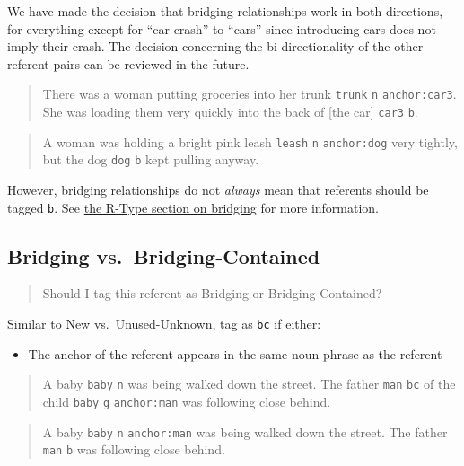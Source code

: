 \documentclass[
]{book}
\providecommand{\tightlist}{%
  \setlength{\itemsep}{0pt}\setlength{\parskip}{0pt}}
\begin{document}
We have made the decision that bridging relationships work in both directions,
for everything except for ``car crash'' to ``cars'' since introducing cars does not imply their crash.
The decision concerning the bi-directionality of the other referent pairs can be reviewed in the future.

\begin{quote}
There was a woman putting groceries into her trunk \texttt{trunk} \texttt{n} \texttt{anchor:car3}.
She was loading them very quickly into the back of {[}the car{]} \texttt{car3} \texttt{b}.
\end{quote}

\begin{quote}
A woman was holding a bright pink leash \texttt{leash} \texttt{n} \texttt{anchor:dog} very tightly,
but the dog \texttt{dog} \texttt{b} kept pulling anyway.
\end{quote}

However, bridging relationships do not \emph{always} mean that
referents should be tagged \texttt{b}.
See \protect\hyperlink{bridging}{the R-Type section on bridging} for more information.

\hypertarget{bridging-vs.-bridging-contained}{%
\subsection{Bridging vs.~Bridging-Contained}\label{bridging-vs.-bridging-contained}}

\begin{quote}
Should I tag this referent as Bridging or Bridging-Contained?
\end{quote}

Similar to \protect\hyperlink{new-vs.-unused-unknown}{New vs.~Unused-Unknown},
tag as \texttt{bc} if either:

\begin{itemize}
\tightlist
\item
  The anchor of the referent appears in the same noun phrase as the referent
\end{itemize}

\begin{quote}
A baby \texttt{baby} \texttt{n} was being walked down the street.
The father \texttt{man} \texttt{bc} of the child \texttt{baby} \texttt{g} \texttt{anchor:man} was following close behind.
\end{quote}

\begin{quote}
A baby \texttt{baby} \texttt{n} \texttt{anchor:man} was being walked down the street.
The father \texttt{man} \texttt{b} was following close behind.
\end{quote}
\end{document}
